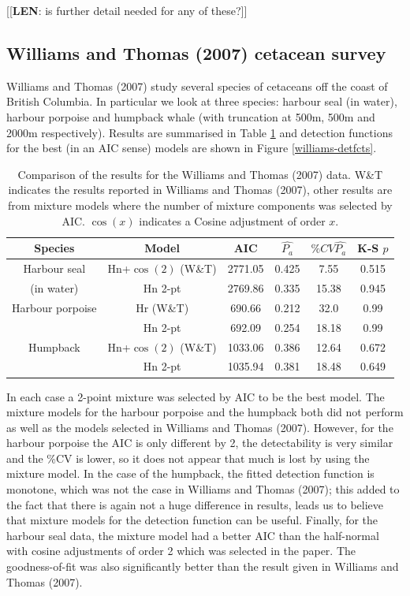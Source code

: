 \documentclass[useAMS,referee, usegraphicx]{biom}
\begin{document}
[[\textbf{LEN}: is further detail needed for any of these?]]

\subsection{Williams and Thomas (2007) cetacean survey}

Williams and Thomas (2007) study several species of cetaceans off the coast of British Columbia. In particular we look at three species: harbour seal (in water), harbour porpoise and humpback whale (with truncation at 500m, 500m and 2000m respectively). Results are summarised in Table \ref{williams-table} and detection functions for the best (in an AIC sense) models are shown in Figure \ref{williams-detfcts}.

\begin{table}
\caption{Comparison of the results for the Williams and Thomas (2007) data. W\&T indicates the results reported in Williams and Thomas (2007), other results are from mixture models where the number of mixture components was selected by AIC. $\cos(x)$ indicates a Cosine adjustment of order $x$.}
\centering
\begin{tabular}{c c c c c c}
\hline \hline
Species & Model & AIC & $\hat{P_a}$ & $\% CV \hat{P_a}$ & K-S $p$\\
\hline
Harbour seal & Hn+$\cos(2)$ (W\&T) & 2771.05 & 0.425 & 7.55 & 0.515\\
(in water) & Hn 2-pt  & 2769.86 & 0.335 & 15.38 & 0.945\\
Harbour porpoise & Hr (W\&T) & 690.66 & 0.212 & 32.0 & 0.99\\
 & Hn 2-pt & 692.09 & 0.254 & 18.18 & 0.99\\
Humpback & Hn+$\cos(2)$ (W\&T) & 1033.06 & 0.386 & 12.64 & 0.672 \\
 & Hn 2-pt & 1035.94 & 0.381 & 18.48 & 0.649 \\
\hline
\end{tabular}
\label{williams-table}
\end{table}

In each case a 2-point mixture was selected by AIC to be the best model. The mixture models for the harbour porpoise and the humpback both did not perform as well as the models selected in Williams and Thomas (2007). However, for the harbour porpoise the AIC is only different by 2, the detectability is very similar and the \%CV is lower, so it does not appear that much is lost by using the mixture model. In the case of the humpback, the fitted detection function is monotone, which was not the case in Williams and Thomas (2007); this added to the fact that there is again not a huge difference in results, leads us to believe that mixture models for the detection function can be useful. Finally, for the harbour seal data, the mixture model had a better AIC than the half-normal with cosine adjustments of order 2 which was selected in the paper. The goodness-of-fit was also significantly better than the result given in Williams and Thomas (2007).
\end{document}
